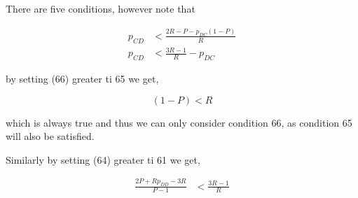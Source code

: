 \documentclass{article}
\theoremstyle{definition}
\begin{document}
There are five conditions, however note that 

\begin{align}
p_{CD}  & < \frac{2 R - P - p_{DC} \left(1 - P\right)}{R}\\
p_{CD} & < \frac{3 R - 1}{R} - p_{DC}
\end{align}

by setting (66) greater ti 65 we get,

\begin{equation*}
  (1 - P) < R
\end{equation*}

which is always true and thus we can only consider condition 66, as condition
65 will also be satisfied.

Similarly by setting (64) greater ti 61 we get,


\begin{align}
  \frac{2 P + R p_{DD} - 3 R}{P - 1}  & < \frac{3 R - 1}{R}
\end{align} 






\end{document}
